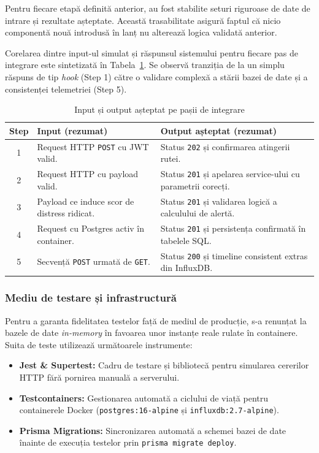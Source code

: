 Pentru fiecare etapă definită anterior, au fost stabilite seturi riguroase de date de intrare și rezultate așteptate. Această trasabilitate asigură faptul că nicio componentă nouă introdusă în lanț nu alterează logica validată anterior.

Corelarea dintre input-ul simulat și răspunsul sistemului pentru fiecare pas de integrare este sintetizată în Tabela~\ref{tab:integration-depth-first-io}. Se observă tranziția de la un simplu răspuns de tip \textit{hook} (Step 1) către o validare complexă a stării bazei de date și a consistenței telemetriei (Step 5).

\begin{table}[htbp]
	\centering
	\small
	\renewcommand{\arraystretch}{1.15}
	\caption{Input și output așteptat pe pașii de integrare}
	\label{tab:integration-depth-first-io}
	\begin{tabular}{|c|p{6.4cm}|p{7.6cm}|}
		\hline
		\textbf{Step} & \textbf{Input (rezumat)} & \textbf{Output așteptat (rezumat)} \\ \hline
		1 & Request HTTP \texttt{POST} cu JWT valid. & Status \texttt{202} și confirmarea atingerii rutei. \\ \hline
		2 & Request HTTP cu payload valid. & Status \texttt{201} și apelarea service-ului cu parametrii corecți. \\ \hline
		3 & Payload ce induce scor de distress ridicat. & Status \texttt{201} și validarea logică a calculului de alertă. \\ \hline
		4 & Request cu Postgres activ în container. & Status \texttt{201} și persistența confirmată în tabelele SQL. \\ \hline
		5 & Secvență \texttt{POST} urmată de \texttt{GET}. & Status \texttt{200} și timeline consistent extras din InfluxDB. \\ \hline
	\end{tabular}
\end{table}

\subsubsection{Mediu de testare și infrastructură}

Pentru a garanta fidelitatea testelor față de mediul de producție, s-a renunțat la bazele de date \textit{in-memory} în favoarea unor instanțe reale rulate în containere. Suita de teste utilizează următoarele instrumente:

\begin{itemize}
	\item \textbf{Jest \& Supertest:} Cadru de testare și bibliotecă pentru simularea cererilor HTTP fără pornirea manuală a serverului.
	\item \textbf{Testcontainers:} Gestionarea automată a ciclului de viață pentru containerele Docker (\texttt{postgres:16-alpine} și \texttt{influxdb:2.7-alpine}).
	\item \textbf{Prisma Migrations:} Sincronizarea automată a schemei bazei de date înainte de execuția testelor prin \texttt{prisma migrate deploy}.
\end{itemize}

